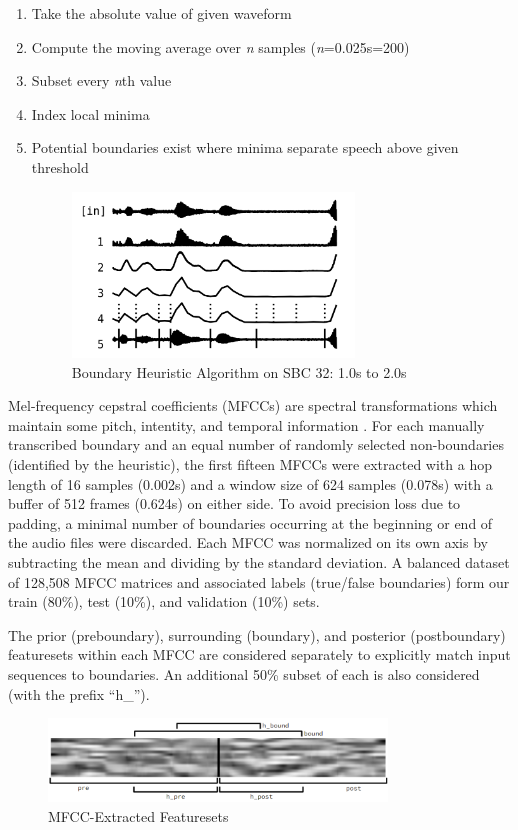 \documentclass[conference]{IEEEtran}
\begin{document}
\begin{enumerate}
\item Take the absolute value of given waveform
\item Compute the moving average over \emph{n} samples (\emph{n}=0.025s=200)
\item Subset every \emph{n}th value
\item Index local minima
\item Potential boundaries exist where minima separate speech above given threshold

\begin{figure}[htbp]
\centerline{\includegraphics[width=75mm]{h_all.png}}
\caption{Boundary Heuristic Algorithm on SBC 32: 1.0s to 2.0s}
\label{fig}
\end{figure}
\end{enumerate}
Mel-frequency cepstral coefficients (MFCCs) are spectral transformations which maintain some pitch, intentity, and temporal information \cite{b9}. For each manually transcribed boundary and an equal number of randomly selected non-boundaries (identified by the heuristic), the first fifteen MFCCs were extracted with a hop length of 16 samples (0.002s) and a window size of 624 samples (0.078s) with a buffer of 512 frames (0.624s) on either side. To avoid precision loss due to padding, a minimal number of boundaries occurring at the beginning or end of the audio files were discarded. Each MFCC was normalized on its own axis by subtracting the mean and dividing by the standard deviation. A balanced dataset of 128,508 MFCC matrices and associated labels (true/false boundaries) form our train (80\%), test (10\%), and validation (10\%) sets.

The prior (preboundary), surrounding (boundary), and posterior (postboundary) featuresets within each MFCC are considered separately to explicitly match input sequences to boundaries. An additional 50\% subset of each is also considered (with the prefix “h\_”).


\begin{figure}[htbp]
\centerline{\includegraphics[width=90mm]{train_seg.png}}
\caption{MFCC-Extracted Featuresets}
\label{fig}
\end{figure}
\end{document}
